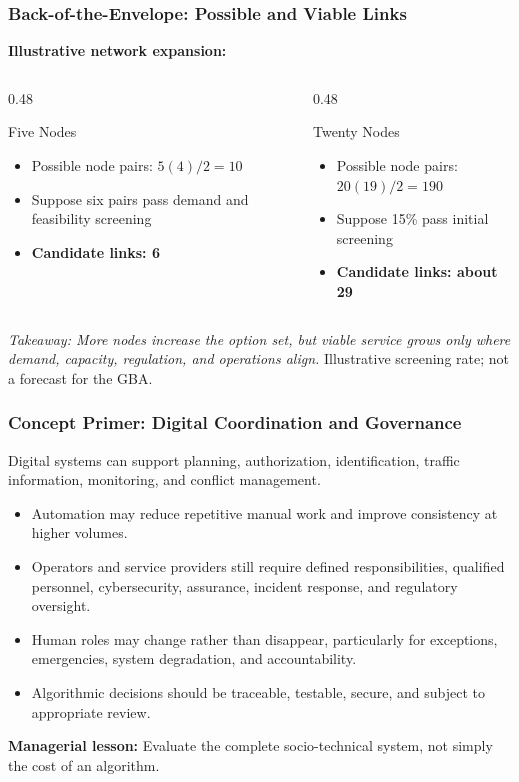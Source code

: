 \documentclass{beamer}
\begin{document}
\begin{frame}[t,shrink=11]
\frametitle{Back-of-the-Envelope: Possible and Viable Links}
\textbf{Illustrative network expansion:}
\begin{columns}[T]
\begin{column}{0.48\textwidth}\begin{block}{Five Nodes}
\begin{itemize}
\item Possible node pairs: $5(4)/2=10$
\item Suppose six pairs pass demand and feasibility screening
\item \textbf{Candidate links: 6}
\end{itemize}\end{block}\end{column}
\begin{column}{0.48\textwidth}\begin{block}{Twenty Nodes}
\begin{itemize}
\item Possible node pairs: $20(19)/2=190$
\item Suppose 15\% pass initial screening
\item \textbf{Candidate links: about 29}
\end{itemize}\end{block}\end{column}
\end{columns}
\textit{Takeaway: More nodes increase the option set, but viable service grows only where demand, capacity, regulation, and operations align.}
\vfill{\tiny Illustrative screening rate; not a forecast for the GBA.}
\end{frame}

\begin{frame}[t]
\frametitle{Concept Primer: Digital Coordination and Governance}
Digital systems can support planning, authorization, identification, traffic information, monitoring, and conflict management.
\begin{itemize}
\item Automation may reduce repetitive manual work and improve consistency at higher volumes.
\item Operators and service providers still require defined responsibilities, qualified personnel, cybersecurity, assurance, incident response, and regulatory oversight.
\item Human roles may change rather than disappear, particularly for exceptions, emergencies, system degradation, and accountability.
\item Algorithmic decisions should be traceable, testable, secure, and subject to appropriate review.
\end{itemize}
\textbf{Managerial lesson:} Evaluate the complete socio-technical system, not simply the cost of an algorithm.
\end{frame}
\end{document}
